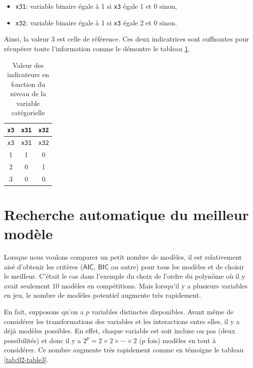 \documentclass[
  11pt,
  letterpaper,
]{book}
\providecommand{\tightlist}{%
  \setlength{\itemsep}{0pt}\setlength{\parskip}{0pt}}
\theoremstyle{definition}
\theoremstyle{definition}
\theoremstyle{definition}
\theoremstyle{definition}
\theoremstyle{remark}
\begin{document}
\begin{itemize}
\tightlist
\item
  \texttt{x31}: variable binaire égale à 1 si \texttt{x3} égale 1 et 0 sinon,
\item
  \texttt{x32}: variable binaire égale à 1 si \texttt{x3} égale 2 et 0 sinon.
\end{itemize}

Ainsi, la valeur 3 est celle de référence. Ces deux indicatrices sont suffisantes pour récupérer toute l'information comme le démontre le tableau \ref{tab:02-dummy}.

\begin{longtable}[]{@{}ccc@{}}
\caption{\label{tab:02-dummy} Valeur des indicateurs en fonction du niveau de la variable catégorielle}\tabularnewline
\toprule
\texttt{x3} & \texttt{x31} & \texttt{x32} \\
\midrule
\endfirsthead
\toprule
\texttt{x3} & \texttt{x31} & \texttt{x32} \\
\midrule
\endhead
1 & 1 & 0 \\
2 & 0 & 1 \\
3 & 0 & 0 \\
\bottomrule
\end{longtable}

\hypertarget{recherche-automatique-du-meilleur-moduxe8le}{%
\section{Recherche automatique du meilleur modèle}\label{recherche-automatique-du-meilleur-moduxe8le}}

Lorsque nous voulons comparer un petit nombre de modèles, il est relativement aisé d'obtenir les critères (\(\mathsf{AIC}\), \(\mathsf{BIC}\) ou autre) pour tous les modèles et de choisir le meilleur. C'était le cas dans l'exemple du choix de l'ordre du polynôme où il y avait seulement 10 modèles en compétitions.
Mais lorsqu'il y a plusieurs variables en jeu, le nombre de modèles potentiel augmente très rapidement.

En fait, supposons qu'on a \(p\) variables distinctes disponibles. Avant même de considérer les transformations des variables et les interactions entre elles, il y a déjà modèles possibles. En effet, chaque variable est soit incluse ou pas (deux possibilités) et donc il y a \(2^p=2\times 2 \times \cdots \times 2\) (\(p\) fois) modèles en tout à considérer. Ce nombre augmente très rapidement comme en témoigne le tableau \ref{tab:02-table3}.
\end{document}
